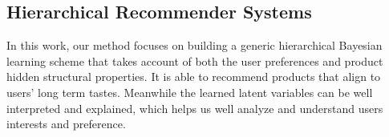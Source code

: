 \subsection{Hierarchical Recommender Systems}

In this work, our method focuses on building a generic hierarchical Bayesian learning scheme that takes account of both the user preferences and product hidden structural properties. It is able to recommend products that align to users' long term tastes. Meanwhile the learned latent variables can be well interpreted and explained, which helps us well analyze and understand users interests and preference.

